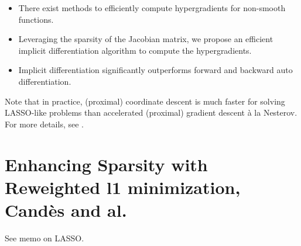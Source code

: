 \documentclass[a4paper,10pt]{article}
\theoremstyle{definition}
\begin{document}
\begin{itemize}
    \item There exist methods to efficiently compute hypergradients for non-smooth functions.
    \item Leveraging the sparsity of the Jacobian matrix, we propose an efficient implicit differentiation algorithm to compute the hypergradients.
    \item Implicit differentiation significantly outperforms forward and backward auto differentiation.
\end{itemize}

\vskip 0.1in

Note that in practice, (proximal) coordinate descent is much faster for solving LASSO-like problems than accelerated (proximal) gradient descent à la Nesterov.
For more details, see \cite{Bertrand_Massias_Anderson}.

\section{Enhancing Sparsity with Reweighted l1 minimization, Candès and al.}

See memo on LASSO.


\newpage


\end{document}
